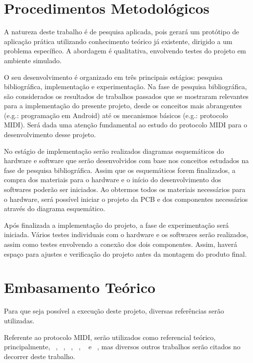     \section{Procedimentos Metodológicos}

        A natureza deste trabalho é de pesquisa aplicada, pois gerará um protótipo de aplicação prática utilizando conhecimento teórico já existente, dirigido a um problema específico. A abordagem é qualitativa, envolvendo testes do projeto em ambiente simulado.

        O seu desenvolvimento é organizado em três principais estágios: pesquisa bibliográfica, implementação e experimentação. Na fase de pesquisa bibliográfica, são considerados os resultados de trabalhos passados que se mostraram relevantes para a implementação do presente projeto, desde os conceitos mais abrangentes (e.g.: programação em Android) até os mecanismos básicos (e.g.: protocolo MIDI). Será dada uma atenção fundamental ao estudo do protocolo MIDI para o desenvolvimento desse projeto.

        No estágio de implementação serão realizados diagramas esquemáticos do hardware e software que serão desenvolvidos com base nos conceitos estudados na fase de pesquisa bibliográfica. Assim que os esquemáticos forem finalizados, a compra dos materiais para o hardware e o início do desenvolvimento dos softwares poderão ser iniciados. Ao obtermos todos os materiais necessários para o hardware, será possível iniciar o projeto da PCB e dos componentes necessários através do diagrama esquemático.

        Após finalizada a implementação do projeto, a fase de experimentação será iniciada. Vários testes individuais com o hardware e os softwares serão realizados, assim como testes envolvendo a conexão dos dois componentes. Assim, haverá espaço para ajustes e verificação do projeto antes da montagem do produto final.

    \section{Embasamento Teórico}

        Para que seja possível a execução deste projeto, diversas referências serão utilizadas.

        Referente ao protocolo MIDI, serão utilizados como referencial teórico, principalmente, ~\cite{Alves}, ~\cite{Hewitt}, ~\cite{Colbeck}, ~\cite{Guerin}, ~\cite{McGuire} e ~\cite{Huber}, mas diversos outros trabalhos serão citados no decorrer deste trabalho.

